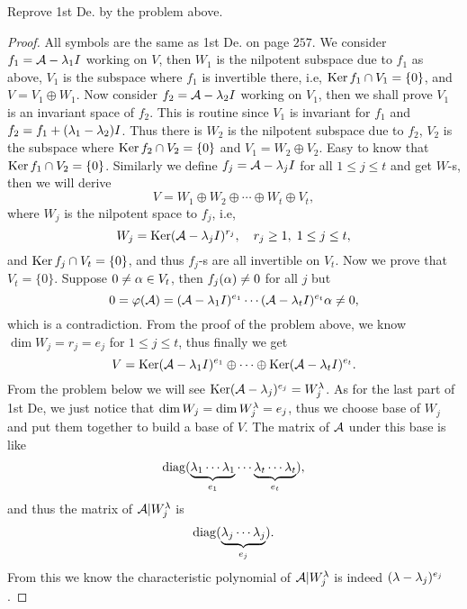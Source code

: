 \begin{pro}%
	Reprove 1st De. by the problem above.
\end{pro}
\begin{proof}
	All symbols are the same as 1st De. on page $257$. We consider $f_1=\mathcal{A}-\lambda_1 I$ working on $V$, then $W_1$ is the nilpotent subspace due to $f_1$ as above, $V_1$ is the subspace where $f_1$ is invertible there, i.e, $\operatorname*{Ker} f_1\cap V_1=\{0\}$, and $V=V_1\oplus W_1$.  Now consider $f_2=\mathcal{A}-\lambda_2 I$ working on $V_1$, then we shall prove $V_1$ is an invariant space of $f_2$. This is routine since $V_1$ is invariant for $f_1$ and $f_2=f_1+(\lambda_1-\lambda_2)I$. Thus there is $W_2$ is the nilpotent subspace due to $f_2$, $V_2$ is the subspace where $\operatorname*{Ker} f_2\cap V_2=\{0\}$ and $V_1=W_2\oplus V_2$. Easy to know that $\operatorname*{Ker} f_1\cap V_2=\{0\}$. Similarly we define $f_j=\mathcal{A}-\lambda_j I$ for all $1\leq j\leq t$ and get $W$-s, then we will derive 
	\[V=W_1\oplus W_2\oplus\cdots\oplus W_t\oplus V_t,\]
	where $W_j$ is the nilpotent space to $f_j$, i.e,
	\[W_j=\operatorname*{Ker} (\mathcal{A}-\lambda_j I)^{r_j},\quad r_j\geq 1,\;1\leq j\leq t,\]
	and $\operatorname*{Ker} f_j\cap V_t=\{0\}$, and thus $f_j$-s are all invertible on $V_t$. Now we prove that $V_t=\{0\}$. Suppose $0\neq \alpha\in V_t$, then $f_j(\alpha)\neq 0$ for all $j$ but
	\[0=\varphi(\mathcal{A})=(\mathcal{A}-\lambda_1 I)^{e_1}\cdots(\mathcal{A}-\lambda_t I)^{e_t}\alpha\neq 0,\]
	which is a contradiction. From the proof of the problem above, we know $\dim W_j=r_j=e_j$ for $1\leq j\leq t$, thus finally we get
	\[V=\operatorname*{Ker}(\mathcal{A}-\lambda_1 I)^{e_1}\oplus\cdots\oplus\operatorname*{Ker}(\mathcal{A}-\lambda_t I)^{e_t}.\]
	From the problem below we will see $\operatorname*{Ker}(\mathcal{A}-\lambda_j)^{e_j}=W_j^{\lambda}$. As for the last part of 1st De, we just notice that $\dim W_j=\dim W_j^{\lambda}=e_j$, thus we choose base of $W_j$ and put them together to build a base of $V$. The matrix of $\mathcal{A}$ under this base is like
	\[\operatorname*{diag}(\underbrace{\lambda_1\cdots\lambda_1}_{e_1}\cdots\underbrace{\lambda_t\cdots\lambda_t}_{e_t}),\]
	and thus the matrix of $\mathcal{A}|W_j^{\lambda}$ is
	\[\operatorname*{diag}(\underbrace{\lambda_j\cdots\lambda_j}_{e_j}).\]
	From this we know the characteristic polynomial of $\mathcal{A}|W_j^{\lambda}$ is indeed $(\lambda-\lambda_j)^{e_j}$. 
\end{proof}


